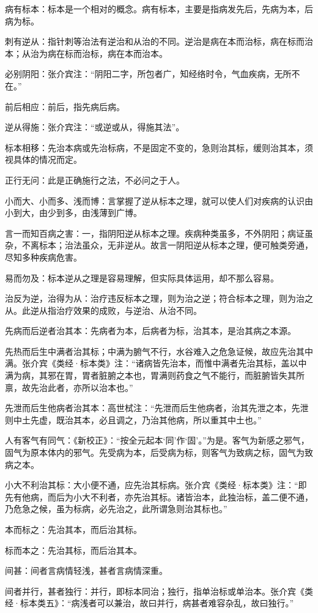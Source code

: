 \documentclass[draft,12pt]{ctexbook}
\begin{document}
\begin{jiaozhu}
  \item 病有标本：标本是一个相对的概念。病有标本，主要是指病发先后，先病为本，后病为标。
  \item 刺有逆从：指针刺等治法有逆治和从治的不同。逆治是病在本而治标，病在标而治本；从治为病在标而治标，病在本而治本。
  \item 必别阴阳：张介宾注：“阴阳二字，所包者广，知经络时令，气血疾病，无所不在。”
  \item 前后相应：前后，指先病后病。
  \item 逆从得施：张介宾注：“或逆或从，得施其法”。
  \item 标本相移：先治本病或先治标病，不是固定不变的，急则治其标，缓则治其本，须视具体的情况而定。
  \item 正行无问：此是正确施行之法，不必问之于人。
  \item 小而大、小而多、浅而博：言掌握了逆从标本之理，就可以使人们对疾病的认识由小到大，由少到多，由浅薄到广博。
  \item 言一而知百病之害：一，指阴阳逆从标本之理。疾病种类虽多，不外阴阳；病证虽杂，不离标本；治法虽众，无非逆从。故言一阴阳逆从标本之理，便可触类旁通，尽知多种疾病危害。
  \item 易而勿及：标本逆从之理是容易理解，但实际具体运用，却不那么容易。
  \item 治反为逆，治得为从：治疗违反标本之理，则为治之逆；符合标本之理，则为治之从。此逆从指治疗效果的成败，与逆治、从治不同。
  \item 先病而后逆者治其本：先病者为本，后病者为标，治其本，是治其病之本源。
  \item 先热而后生中满者治其标；中满为腑气不行，水谷难入之危急证候，故应先治其中满。张介宾《类经·标本类》注：“诸病皆先治本，而惟中满者先治其标，盖以中满为病，其邪在胃，胃者脏腑之本也，胃满则药食之气不能行，而脏腑皆失其所禀，故先治此者，亦所以治本也。”
  \item 先泄而后生他病者治其本：高世栻注：“先泄而后生他病者，治其先泄之本，先泄则中土先虚，既治其本，必且调之，乃治其他病，所以重其中土也。”
  \item 人有客气有同气：《新校正》：“按全元起本‘同’作‘固’。”为是。客气为新感之邪气，固气为原本体内的邪气。先受病为本，后受病为标，则客气为致病之标，固气为致病之本。
  \item 小大不利治其标：大小便不通，应先治其标病。张介宾《类经·标本类》注：“即先有他病，而后为小大不利者，亦先治其标。诸皆治本，此独治标，盖二便不通，乃危急之候，虽为标病，必先治之，此所谓急则治其标也。”
  \item 本而标之：先治其本，而后治其标。
  \item 标而本之：先治其标，而后治其本。
  \item 间甚：间者言病情轻浅，甚者言病情深重。
  \item 间者并行，甚者独行：并行，即标本同治；独行，指单治标或单治本。张介宾《类经·标本类五》：“病浅者可以兼治，故曰并行，病甚者难容杂乱，故曰独行。”
\end{jiaozhu}
\end{document}
